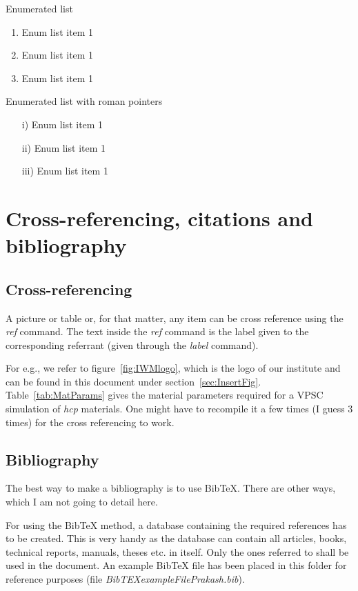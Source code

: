 \documentclass[a4paper,12pt,times]{article} %
\begin{document}
\noindent
Enumerated list
\begin{enumerate}
 \item Enum list item 1
 \item Enum list item 1
 \item Enum list item 1
\end{enumerate}

\noindent
Enumerated list with roman pointers
\begin{enumerate}
 \item[i)] Enum list item 1
 \item[ii)] Enum list item 1
 \item[iii)] Enum list item 1
\end{enumerate}


\section{Cross-referencing, citations and bibliography}
\subsection{Cross-referencing}
A picture or table or, for that matter, any item can be cross reference using the \emph{ref} command. The text inside the \emph{ref} command is the label given to the corresponding referrant (given through the \emph{label} command).

For e.g., we refer to figure~\ref{fig:IWMlogo}, which is the logo of our institute and can be found in this document under section~\ref{sec:InsertFig}. Table~\ref{tab:MatParams} gives the material parameters required for a VPSC simulation of \emph{hcp} materials. One might have to recompile it a few times (I guess 3 times) for the cross referencing to work.

\subsection{Bibliography}
The best way to make a bibliography is to use BibTeX. There are other ways, which I am not going to detail here.

For using the BibTeX method, a database containing the required references has to be created. This is very handy as the database can contain all articles, books, technical reports, manuals, theses etc. in itself. Only the ones referred to shall be used in the document. An example BibTeX file has been placed in this folder for reference purposes (file \emph{BibTEXexampleFilePrakash.bib}).
\end{document}
